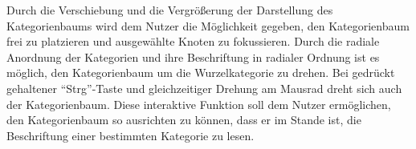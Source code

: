 Durch die Verschiebung und die Vergrößerung der Darstellung des Kategorienbaums wird dem Nutzer die Möglichkeit gegeben, den Kategorienbaum frei zu platzieren und ausgewählte Knoten zu fokussieren.
Durch die radiale Anordnung der Kategorien und ihre Beschriftung in radialer Ordnung ist es möglich, den Kategorienbaum um die Wurzelkategorie zu drehen.
Bei gedrückt gehaltener "`Strg"'-Taste und gleichzeitiger Drehung am Mausrad dreht sich auch der Kategorienbaum.
Diese interaktive Funktion soll dem Nutzer ermöglichen, den Kategorienbaum so ausrichten zu können, dass er im Stande ist, die Beschriftung einer bestimmten Kategorie zu lesen.
\begin{figure}
    \centering
\end{figure}
